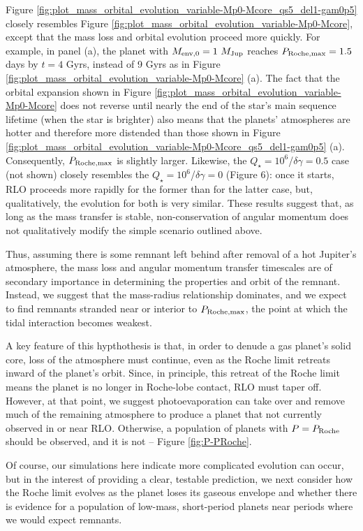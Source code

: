 \documentclass{svjour3}                     %
\begin{document}
Figure \ref{fig:plot_mass_orbital_evolution_variable-Mp0-Mcore_qs5_del1-gam0p5} closely resembles Figure \ref{fig:plot_mass_orbital_evolution_variable-Mp0-Mcore}, except that the mass loss and orbital evolution proceed more quickly. For example, in panel (a), the planet with $M_{\rm env, 0} = 1\ M_{\rm Jup}$ reaches $P_{\rm Roche, max} = 1.5$ days by $t = 4$ Gyrs, instead of 9 Gyrs as in Figure \ref{fig:plot_mass_orbital_evolution_variable-Mp0-Mcore} (a). The fact that the orbital expansion shown in Figure \ref{fig:plot_mass_orbital_evolution_variable-Mp0-Mcore} does not reverse until nearly the end of the star's main sequence lifetime (when the star is brighter) also means that the planets' atmospheres are hotter and therefore more distended than those shown in Figure \ref{fig:plot_mass_orbital_evolution_variable-Mp0-Mcore_qs5_del1-gam0p5} (a). Consequently, $P_{\rm Roche, max}$ is slightly larger. Likewise, the $Q_\star = 10^6$/$\delta \gamma = 0.5$ case (not shown) closely resembles the $Q_\star = 10^6$/$\delta \gamma = 0$ (Figure 6): once it starts, RLO proceeds more rapidly for the former than for the latter case, but, qualitatively, the evolution for both is very similar. These results suggest that, as long as the mass transfer is stable, non-conservation of angular momentum does not qualitatively modify the simple scenario outlined above. 

Thus, assuming there is some remnant left behind after removal of a hot Jupiter's atmosphere, the mass loss and angular momentum transfer timescales are of secondary importance in determining the properties and orbit of the remnant. Instead, we suggest that the mass-radius relationship dominates, and we expect to find remnants stranded near or interior to $P_{\rm Roche, max}$, the point at which the tidal interaction becomes weakest. 

A key feature of this hypthothesis is that, in order to denude a gas planet's solid core, loss of the atmosphere must continue, even as the Roche limit retreats inward of the planet's orbit. Since, in principle, this retreat of the Roche limit means the planet is no longer in Roche-lobe contact, RLO must taper off. However, at that point, we suggest photoevaporation can take over and remove much of the remaining atmosphere to produce a planet that not currently observed in or near RLO. Otherwise, a population of planets with $P = P_{\rm Roche}$ should be observed, and it is not -- Figure \ref{fig:P-PRoche}.

Of course, our simulations here indicate more complicated evolution can occur, but in the interest of providing a clear, testable prediction, we next consider how the Roche limit evolves as the planet loses its gaseous envelope and whether there is evidence for a population of low-mass, short-period planets near periods where we would expect remnants.
\end{document}
